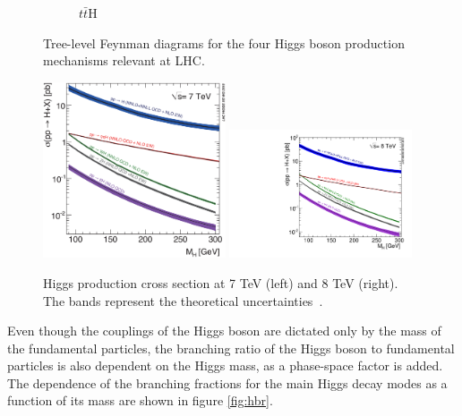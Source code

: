 \begin{figure}
\begin{subfigure}[b]{0.3\textwidth}
                \caption{$t\bar{t}$H}
                \label{fig:tth}
        \end{subfigure}
        \caption{Tree-level Feynman diagrams for the four Higgs boson production mechanisms relevant at LHC.}\label{fig:hprod}
\end{figure}

\begin{figure}
        \centering
	\includegraphics[width=0.48\textwidth]{1_Introduction_Th_and_Exp/pics/Higgs_XS_7TeV_LM.eps}
	\includegraphics[width=0.48\textwidth]{1_Introduction_Th_and_Exp/pics/Higgs_XS_8TeV_LM.pdf}
       \caption{Higgs production cross section at 7 TeV (left) and 8 TeV (right). The bands represent the theoretical uncertainties~\cite{Heinemeyer:2013tqa}.}
       \label{fig:hxs}
\end{figure}


Even though the couplings of the Higgs boson are dictated only by the mass of the fundamental particles, the branching ratio of the Higgs boson to fundamental particles is also dependent on the Higgs mass, as a phase-space factor is added. The dependence of the branching fractions for the main Higgs decay modes as a function of its mass are shown in figure \ref{fig:hbr}. 

